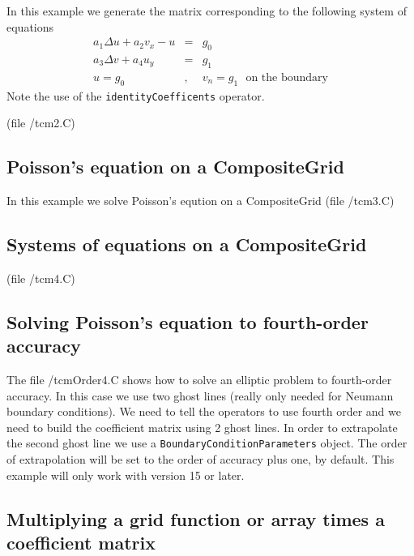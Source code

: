 In this example we generate the matrix corresponding to the following
system of equations
\begin{eqnarray*}
 a_1 \Delta u + a_2 v_x - u &=& g_0 \\
 a_3\Delta v + a_4 u_y &=& g_1 \\
   u=g_0 &,& v_n=g_1 ~~~\mbox{on the boundary}
\end{eqnarray*}
Note the use of the {\tt identityCoefficents} operator.


(file {\ff \examples/tcm2.C})
{\footnotesize
{}
}


\subsection{Poisson's equation on a CompositeGrid}

In this example we solve Poisson's eqution on a CompositeGrid
(file {\ff \examples/tcm3.C})
{\footnotesize
{}
}

\subsection{Systems of equations on a CompositeGrid}

(file {\ff \examples/tcm4.C})
{\footnotesize
{}
}


\subsection{Solving Poisson's equation to fourth-order accuracy}

The file {\ff \examples/tcmOrder4.C} shows how to solve an elliptic problem to fourth-order
accuracy. In this case we use two ghost lines (really only needed for Neumann
boundary conditions). We need to tell the operators to use fourth order and we need to build
the coefficient matrix using 2 ghost lines. In order to extrapolate the second ghost line
we use a {\tt BoundaryConditionParameters} object. The order of extrapolation will be set
to the order of accuracy plus one, by default. This example will only work with version 15 or later.

\subsection{Multiplying a grid function or array times a coefficient matrix}

